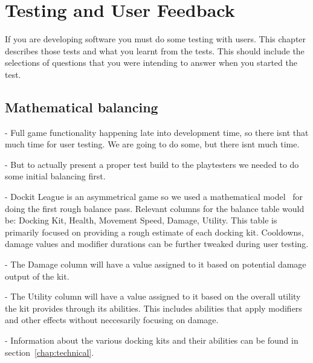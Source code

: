 \chapter{Testing and User Feedback}
\label{chap:testing}
If you are developing software you must do some testing with users.  This chapter describes those tests and what you learnt from the tests.  This should include the selections of questions that you were intending to answer when you started the test.  

\section{Mathematical balancing}
     - Full game functionality happening late into development time, so there isnt that much time for user testing. We are going to do some, but there isnt much time. 
     
     - But to actually present a proper test build to the playtesters we needed to do some initial balancing first.
     
     - Dockit League is an asymmetrical game so we used a mathematical model~\cite{schell2014art} for doing the first rough balance pass. Relevant columns for the balance table would be: Docking Kit, Health, Movement Speed, Damage, Utility. This table is primarily focused on providing a rough estimate of each docking kit. Cooldowns, damage values and modifier durations can be further tweaked during user testing. 
     
     - The Damage column will have a value assigned to it based on potential damage output of the kit. 
     
     - The Utility column will have a value assigned to it based on the overall utility the kit provides through its abilities. This includes abilities that apply modifiers and other effects without neccesarily focusing on damage. 
     
     - Information about the various docking kits and their abilities can be found in section~\ref{chap:technical}.
     

